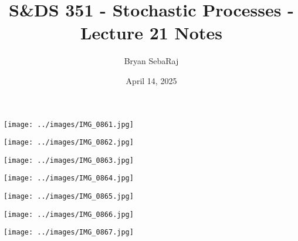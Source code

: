 \documentclass{article}
\title{S\&DS 351 - Stochastic Processes - Lecture 21 Notes}
\author{Bryan SebaRaj}
\date{April 14, 2025}
\begin{document}
\maketitle

\texttt{[image: ../images/IMG\_0861.jpg]}

\texttt{[image: ../images/IMG\_0862.jpg]}

\texttt{[image: ../images/IMG\_0863.jpg]}

\texttt{[image: ../images/IMG\_0864.jpg]}

\texttt{[image: ../images/IMG\_0865.jpg]}

\texttt{[image: ../images/IMG\_0866.jpg]}

\texttt{[image: ../images/IMG\_0867.jpg]}
\end{document}
